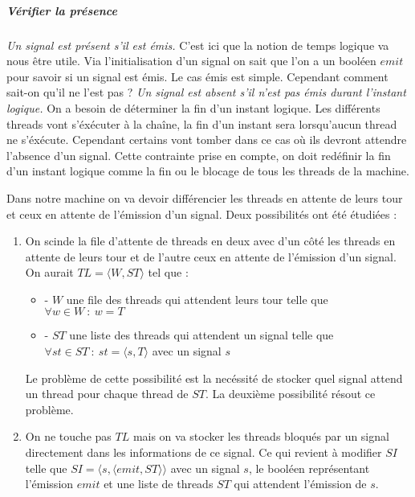 \documentclass[10pt,a4paper]{report}
\begin{document}
	
	\subparagraph{Vérifier la présence}
	\textit{Un signal est présent s'il est émis.}
	\smallbreak
	C'est ici que la notion de temps logique va nous être utile. Via l'initialisation d'un signal on sait que l'on a un booléen $emit$ pour savoir si un signal est émis. Le cas émis est simple. Cependant comment sait-on qu'il ne l'est pas ?
	\smallbreak
	\textit{Un signal est absent s'il n'est pas émis durant l'instant logique.}
	\smallbreak
	On a besoin de déterminer la fin d'un instant logique. Les différents threads vont s'éxécuter à la chaîne, la fin d'un instant sera lorsqu'aucun thread ne s'éxécute. Cependant certains vont tomber dans ce cas où ils devront attendre l'absence d'un signal. Cette contrainte prise en compte, on doit redéfinir la fin d'un instant logique comme la fin ou le blocage de tous les threads de la machine.
	\medbreak
	
	Dans notre machine on va devoir différencier les threads en attente de leurs tour et ceux en attente de l'émission d'un signal. Deux possibilités ont été étudiées :
	\begin{enumerate}
		\item On scinde la file d'attente de threads en deux avec d'un côté les threads en attente de leurs tour et de l'autre ceux en attente de l'émission d'un signal. On aurait $TL =\langle W,ST\rangle$ tel que :
		\begin{itemize}
			\item[] - $W$ une file des threads qui attendent leurs tour telle que $\forall w \in W~:~w = T$ 
			\item[] - $ST$ une liste des threads qui attendent un signal telle que $\forall st \in ST~:~st = \langle s,T\rangle$ avec un signal $s$ 
		\end{itemize}
		\medbreak
		
		Le problème de cette possibilité est la necéssité de stocker quel signal attend un thread pour chaque thread de $ST$. La deuxième possibilité résout ce problème.
		\item On ne touche pas $TL$ mais on va stocker les threads bloqués par un signal directement dans les informations de ce signal. Ce qui revient à modifier $SI$ telle que $SI = \langle s , \langle emit , ST \rangle\rangle$ avec un signal $s$, le booléen représentant l'émission $emit$ et une liste de threads $ST$ qui attendent l'émission de $s$.
	\end{enumerate}
	\medbreak
	
\end{document}
